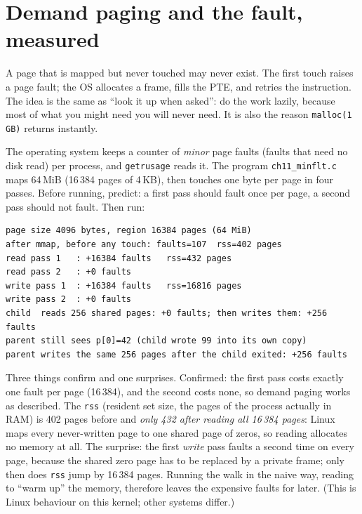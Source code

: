 \section{Demand paging and the fault, measured}
\label{sec:fault11}

A page that is mapped but never touched may never exist. The first
touch raises a page fault; the OS allocates a frame, fills the PTE,
and retries the instruction. The idea is the same as ``look it up when
asked'': do the work lazily, because most of what you might need you
will never need. It is also the reason \texttt{malloc(1\,GB)} returns
instantly.

\begin{example}
The operating system keeps a counter of \emph{minor} page faults (faults that
need no disk read) per process, and \texttt{getrusage} reads it. The
program \texttt{ch11\_minflt.c} maps 64\,MiB (16\,384 pages of 4\,KB), then
touches one byte per page in four passes. Before running, predict: a
first pass should fault once per page, a second pass should not fault.
Then run:

\begin{lstlisting}[language={},label={lst:minflt11},caption={Linux x86\_64 container, \texttt{./ch11\_minflt} (captured in \texttt{code/ch11\_minflt\_linux.txt}). Page faults counted by the kernel, not estimated.}]
page size 4096 bytes, region 16384 pages (64 MiB)
after mmap, before any touch: faults=107  rss=402 pages
read pass 1   : +16384 faults   rss=432 pages
read pass 2   : +0 faults
write pass 1  : +16384 faults   rss=16816 pages
write pass 2  : +0 faults
child  reads 256 shared pages: +0 faults; then writes them: +256 faults
parent still sees p[0]=42 (child wrote 99 into its own copy)
parent writes the same 256 pages after the child exited: +256 faults
\end{lstlisting}

Three things confirm and one surprises. Confirmed: the first pass costs
exactly one fault per page (16\,384), and the second costs none, so
demand paging works as described. The \texttt{rss} (resident set size,
the pages of the process actually in RAM) is 402 pages before and
\emph{only 432 after reading all 16\,384 pages}: Linux maps every
never-written page to one shared page of zeros, so reading allocates no
memory at all. The surprise: the first \emph{write} pass faults a second
time on every page, because the shared zero page has to be replaced by a
private frame; only then does \texttt{rss} jump by 16\,384 pages. Running
the walk in the naive way, reading to ``warm up'' the memory, therefore
leaves the expensive faults for later. (This is Linux behaviour on this
kernel; other systems differ.)
\end{example}

